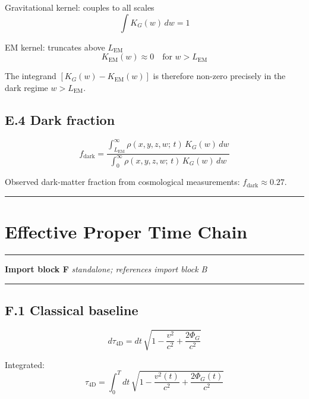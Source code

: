 \documentclass[11pt, a4paper, oneside]{article}
\theoremstyle{definition}
\theoremstyle{plain}
\theoremstyle{remark}
\begin{document}
Gravitational kernel: couples to all scales
\begin{equation}
  \int K_G(w)\, dw = 1
  \tag{E.4}
\end{equation}

EM kernel: truncates above $L_\text{EM}$
\begin{equation}
  K_\text{EM}(w) \approx 0 \quad \text{for } w > L_\text{EM}
  \tag{E.5}
\end{equation}

The integrand $[K_G(w) - K_\text{EM}(w)]$ is therefore non-zero precisely
in the dark regime $w > L_\text{EM}$.

\subsection*{E.4 Dark fraction}

\begin{equation}
  f_\text{dark} = \frac{\int_{L_\text{EM}}^\infty
	\rho(x,y,z,w;\,t)\, K_G(w)\, dw}
	{\int_0^\infty \rho(x,y,z,w;\,t)\, K_G(w)\, dw}
  \tag{E.6}
\end{equation}

Observed dark-matter fraction from cosmological measurements:
$f_\text{dark} \approx 0.27$.

\noindent\rule{\linewidth}{0.4pt}

\section{Effective Proper Time Chain}
\label{sec:propertime}

\noindent\rule{\linewidth}{0.8pt}
\textbf{Import block F} \hfill \textit{standalone; references import block B}
\noindent\rule{\linewidth}{0.4pt}

\subsection*{F.1 Classical baseline}

\begin{equation}
  d\tau_\text{4D}
  = dt\,\sqrt{
	  1 - \frac{v^2}{c^2} + \frac{2\Phi_G}{c^2}
	}
  \tag{F.1}
\end{equation}

Integrated:
\begin{equation}
  \tau_\text{4D}
  = \int_0^T dt\,\sqrt{
	  1 - \frac{v^2(t)}{c^2} + \frac{2\Phi_G(t)}{c^2}
	}
  \tag{F.2}
\end{equation}
\end{document}
